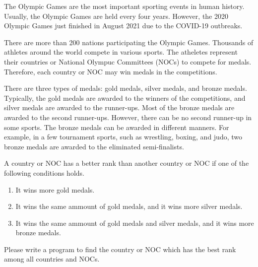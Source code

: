 The Olympic Games are the most important sporting events in human history.
Usually, the Olympic Games are held every four years.
However, the 2020 Olympic Games just finished in August 2021 due to
the COVID-19 outbreaks.

There are more than 200 nations participating the Olympic Games. 
Thousands of athletes around the world compete in various sports. 
The atheletes represent their countries or National Olympuc Committees (NOCs)
to compete for medals. 
Therefore, each country or NOC may win medals in the competitions.

There are three types of medals: gold medals, silver medals, and bronze medals. 
Typically, the gold medals are awarded to the winners of the competitions,
and silver medals are awarded to the runner-ups.
Most of the bronze medals are awarded to the second runner-ups.
However, there can be no second runner-up in some sports.
The bronze medals can be awarded in different manners. 
For example, in a few tournament sports, such as wrestling, boxing, and judo,
two bronze medals are awarded to the eliminated semi-finalists. 

A country or NOC has a better rank than another country or NOC
if one of the following conditions holds.
\begin{enumerate}
\item It wins more gold medals.
\item It wins the same ammount of gold medals, and it wins more silver medals.
\item It wins the same ammount of gold medals and silver medals, 
and it wins more bronze medals.
\end{enumerate}

Please write a program to find the country or NOC which has the best rank
among all countries and NOCs.
